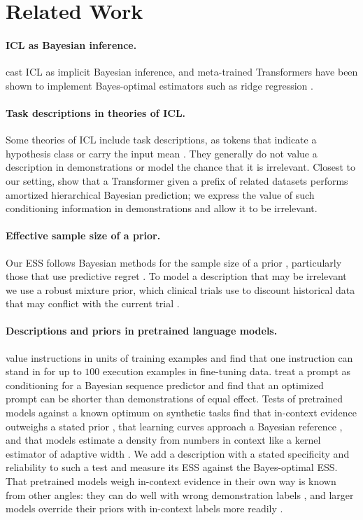 \documentclass{article}
\begin{document}
\section{Related Work}
\paragraph{ICL as Bayesian inference.} \citet{xie2022} cast ICL as implicit Bayesian inference, and meta-trained Transformers have been shown to implement Bayes-optimal estimators such as ridge regression \citep{akyurek2023, raventos2023, panwar2024}.

\paragraph{Task descriptions in theories of ICL.} Some theories of ICL include task descriptions, as tokens that indicate a hypothesis class or carry the input mean \citep{huangge2025, lin2025, tong2026, lin2024}. They generally do not value a description in demonstrations or model the chance that it is irrelevant. Closest to our setting, \citet{zhu2026} show that a Transformer given a prefix of related datasets performs amortized hierarchical Bayesian prediction; we express the value of such conditioning information in demonstrations and allow it to be irrelevant.

\paragraph{Effective sample size of a prior.} Our ESS follows Bayesian methods for the sample size of a prior \citep{morita2008, reimherr2021, neuenschwander2020}, particularly those that use predictive regret \citep{reznik2026}. To model a description that may be irrelevant we use a robust mixture prior, which clinical trials use to discount historical data that may conflict with the current trial \citep{schmidli2014}.

\paragraph{Descriptions and priors in pretrained language models.} \citet{cook2026} value instructions in units of training examples and find that one instruction can stand in for up to $100$ execution examples in fine-tuning data. \citet{wenliang2025} treat a prompt as conditioning for a Bayesian sequence predictor and find that an optimized prompt can be shorter than demonstrations of equal effect. Tests of pretrained models against a known optimum on synthetic tasks find that in-context evidence outweighs a stated prior \citep{gupta2025}, that learning curves approach a Bayesian reference \citep{akata2026}, and that models estimate a density from numbers in context like a kernel estimator of adaptive width \citep{liu2025}. We add a description with a stated specificity and reliability to such a test and measure its ESS against the Bayes-optimal ESS. That pretrained models weigh in-context evidence in their own way is known from other angles: they can do well with wrong demonstration labels \citep{min2022}, and larger models override their priors with in-context labels more readily \citep{wei2023}.
\end{document}

